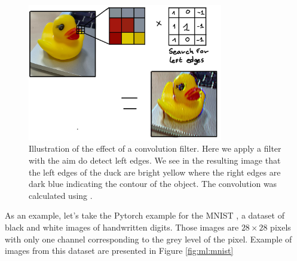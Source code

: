 \documentclass[../main.tex]{subfiles}
\begin{document}
\begin{figure}[ht]
  \centering
  \includegraphics[height=6cm]{images/ml/convolution_exammple.jpg}
  \caption{Illustration of the effect of a convolution filter. Here we apply a filter with the aim do detect left edges. We see in the resulting image that the left edges of the duck are bright yellow where the right edges are dark blue indicating the contour of the object. The convolution was calculated using \cite{allen_generic-github-userimage-convolution-playground_2024}.}
  \label{fig:ml:conv_filter}
\end{figure}

As an example, let's take the Pytorch \cite{ansel_pytorch_2024} example for the MNIST \cite{lecun_gradient-based_1998}, a dataset of black and white images of handwritten digits. Those images are $28 \times 28$ pixels with only one channel corresponding to the grey level of the pixel. Example of images from this dataset are presented in Figure \ref{fig:ml:mnist}
\end{document}
